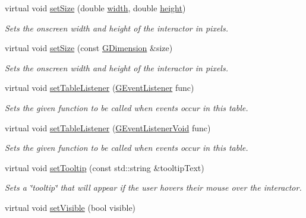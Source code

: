 \begin{DoxyCompactItemize}
virtual void \mbox{\hyperlink{classsgl_1_1GInteractor_aca25d49481f9bf5fc8f7df4c086c4ce7}{set\+Size}} (double \mbox{\hyperlink{classsgl_1_1GTable_ad72663daf610f2a0833a2fc3d78e4fdf}{width}}, double \mbox{\hyperlink{classsgl_1_1GTable_ad3774f6419003470f54fd495124ef51f}{height}})
\begin{DoxyCompactList}\small\item\em Sets the onscreen width and height of the interactor in pixels. \end{DoxyCompactList}\item 
virtual void \mbox{\hyperlink{classsgl_1_1GInteractor_ae2b628228f192c2702c4ce941b2af68f}{set\+Size}} (const \mbox{\hyperlink{structsgl_1_1GDimension}{G\+Dimension}} \&size)
\begin{DoxyCompactList}\small\item\em Sets the onscreen width and height of the interactor in pixels. \end{DoxyCompactList}\item 
virtual void \mbox{\hyperlink{classsgl_1_1GTable_aeeb00b5caf01028e9de6f2dd6ef4b9bd}{set\+Table\+Listener}} (\mbox{\hyperlink{namespacesgl_ae9f3e9eab70035da1a2b114e21357b25}{G\+Event\+Listener}} func)
\begin{DoxyCompactList}\small\item\em Sets the given function to be called when events occur in this table. \end{DoxyCompactList}\item 
virtual void \mbox{\hyperlink{classsgl_1_1GTable_a0412cb4e079085ed5cb3bcdf2921ac84}{set\+Table\+Listener}} (\mbox{\hyperlink{namespacesgl_a54427ce97bb1c2804e4fe2b0a62e8b17}{G\+Event\+Listener\+Void}} func)
\begin{DoxyCompactList}\small\item\em Sets the given function to be called when events occur in this table. \end{DoxyCompactList}\item 
virtual void \mbox{\hyperlink{classsgl_1_1GInteractor_a039e0e49beaecc275efce02d416acea8}{set\+Tooltip}} (const std\+::string \&tooltip\+Text)
\begin{DoxyCompactList}\small\item\em Sets a \char`\"{}tooltip\char`\"{} that will appear if the user hovers their mouse over the interactor. \end{DoxyCompactList}\item 
virtual void \mbox{\hyperlink{classsgl_1_1GInteractor_a18e44e30b31525a243960ca3928125aa}{set\+Visible}} (bool visible)

\end{DoxyCompactItemize}
